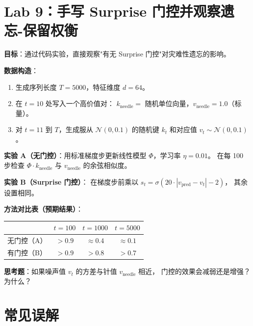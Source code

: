 \section{Lab 9：手写 Surprise 门控并观察遗忘-保留权衡}
\label{sec:titans_lab}

\begin{labbox}[title=Lab 9：Surprise 门控对长序列遗忘的缓解]

\textbf{目标}：通过代码实验，直接观察"有无 Surprise 门控"对灾难性遗忘的影响。

\textbf{数据构造}：
\begin{enumerate}
  \item 生成序列长度 $T = 5000$，特征维度 $d = 64$。
  \item 在 $t = 10$ 处写入一个高价值对：
    $k_{\text{needle}} = $ 随机单位向量，$v_{\text{needle}} = 1.0$（标量）。
  \item 对 $t = 11$ 到 $T$，生成服从 $\mathcal{N}(0, 0.1)$ 的随机键 $k_t$
    和对应值 $v_t \sim \mathcal{N}(0, 0.1)$。
\end{enumerate}

\textbf{实验 A（无门控）}：用标准梯度步更新线性模型 $\Phi$，学习率 $\eta = 0.01$。
在每 100 步检查 $\Phi \cdot k_{\text{needle}}$ 与 $v_{\text{needle}}$ 的余弦相似度。

\textbf{实验 B（Surprise 门控）}：
在梯度步前乘以 $s_t = \sigma(20 \cdot |v_{\text{pred}} - v_t| - 2)$，
其余设置相同。

\textbf{方法对比表（预期结果）}：
\begin{center}
\begin{tabular}{lccc}
\toprule
& $t = 100$ & $t = 1000$ & $t = 5000$ \\
\midrule
无门控（A） & $> 0.9$ & $\approx 0.4$ & $\approx 0.1$ \\
有门控（B） & $> 0.9$ & $> 0.8$ & $> 0.7$ \\
\bottomrule
\end{tabular}
\end{center}

\textbf{思考题}：如果噪声值 $v_t$ 的方差与针值 $v_{\text{needle}}$ 相近，
门控的效果会减弱还是增强？为什么？
\end{labbox}

\section{常见误解}
\label{sec:titans_misconceptions}

